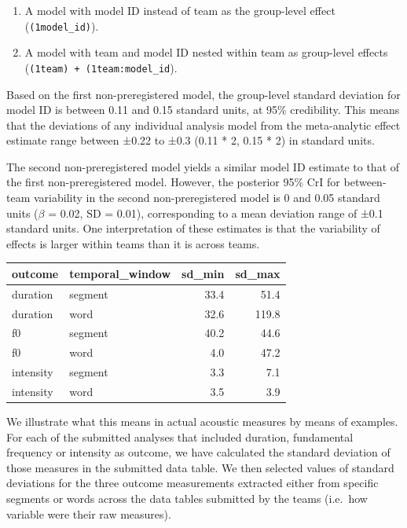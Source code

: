 \documentclass[Review,times,sageh]{sagej}
\providecommand{\tightlist}{\setlength{\itemsep}{0pt}\setlength{\parskip}{0pt}}
\begin{document}
\begin{enumerate}
\def\labelenumi{\arabic{enumi}.}
\tightlist
\item
  A model with model ID instead of team as the group-level effect (\texttt{(1\textbar{}model\_id)}).
\item
  A model with team and model ID nested within team as group-level effects (\texttt{(1\textbar{}team)\ +\ (1\textbar{}team:model\_id}).
\end{enumerate}

Based on the first non-preregistered model, the group-level standard deviation for model ID is between 0.11 and 0.15 standard units, at 95\% credibility.
This means that the deviations of any individual analysis model from the meta-analytic effect estimate range between ±0.22 to ±0.3 (0.11 * 2, 0.15 * 2) in standard units.

The second non-preregistered model yields a similar model ID estimate to that of the first non-preregistered model.
However, the posterior 95\% CrI for between-team variability in the second non-preregistered model is 0 and 0.05 standard units (\(\beta\) = 0.02, SD = 0.01), corresponding to a mean deviation range of ±0.1 standard units.
One interpretation of these estimates is that the variability of effects is larger within teams than it is across teams.

\begin{tabular}{l|l|r|r}
\hline
outcome & temporal\_window & sd\_min & sd\_max\\
\hline
duration & segment & 33.4 & 51.4\\
\hline
duration & word & 32.6 & 119.8\\
\hline
f0 & segment & 40.2 & 44.6\\
\hline
f0 & word & 4.0 & 47.2\\
\hline
intensity & segment & 3.3 & 7.1\\
\hline
intensity & word & 3.5 & 3.9\\
\hline
\end{tabular}

We illustrate what this means in actual acoustic measures by means of examples.
For each of the submitted analyses that included duration, fundamental frequency or intensity as outcome, we have calculated the standard deviation of those measures in the submitted data table.
We then selected values of standard deviations for the three outcome measurements extracted either from specific segments or words across the data tables submitted by the teams (i.e.~how variable were their raw measures).
\end{document}

